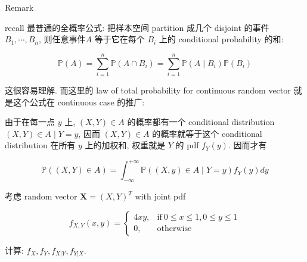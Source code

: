 \documentclass{qlnotes-export}
\begin{document}
\begin{qlremark}{Remark}

recall 最普通的全概率公式: 把样本空间 partition 成几个 disjoint 的事件 \(B_{1},\cdots,B_{n}\), 则任意事件\(A\) 等于它在每个 \(B_{i}\) 上的 conditional probability 的和:

\[{\mathbb{P}}(A) = \sum\limits_{i = 1}^{n}{\mathbb{P}}(A \cap B_{i}) = \sum\limits_{i = 1}^{n}{\mathbb{P}}(A \mid B_{i}){\mathbb{P}}(B_{i})\]

这很容易理解. 而这里的 law of total probability for continuous random vector 就是这个公式在 continuous case 的推广:

由于在每一点 \(y\) 上, \((X,Y) \in A\) 的概率都有一个 conditional distribution \(\left. (X,Y) \in A \middle| Y = y \right.\), 因而 \((X,Y) \in A\) 的概率就等于这个 conditional distribution 在所有 \(y\) 上的加权和, 权重就是 \(Y\) 的 pdf \(f_{Y}(y)\). 因而才有

\[{\mathbb{P}}((X,Y) \in A) = \int_{- \infty}^{+ \infty}{\mathbb{P}}((X,y) \in A \mid Y = y)f_{Y}(y)dy\]

\end{qlremark}

\begin{example}

考虑 random vector \(\mathbf{X} = (X,Y)^{T}\) with joint pdf

\[f_{X,Y}(x,y) = \left\{ \begin{matrix}
{4xy,} & {\text{if}\ 0 \leq x \leq 1,0 \leq y \leq 1} \\
{0,} & \text{otherwise}
\end{matrix} \right.\]

计算: \(f_{X},f_{Y},f_{X|Y},f_{Y|X}\).

\end{example}
\end{document}
